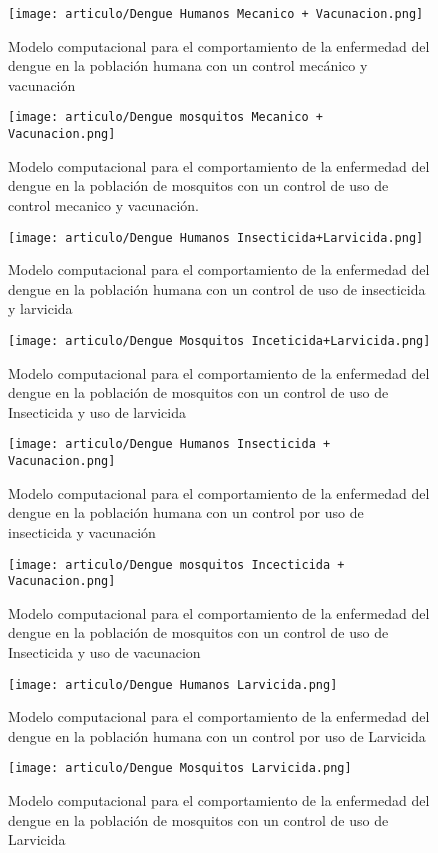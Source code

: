 \documentclass[journal]{IEEEtran}
\begin{document}
\begin{figure}[h]
\texttt{[image: articulo/Dengue Humanos Mecanico + Vacunacion.png]}
\centering 
\caption{Modelo computacional para el comportamiento de la enfermedad del dengue en la población humana con un control mecánico y vacunación}
\label{9J}
\end{figure}
\begin{figure}[h]
\texttt{[image: articulo/Dengue mosquitos Mecanico + Vacunacion.png]}
\centering 
\caption{Modelo computacional para el comportamiento de la enfermedad del dengue en la población de mosquitos con un control de uso de control mecanico y vacunación.}
\label{11J}
\end{figure}
\begin{figure}[h]
\texttt{[image: articulo/Dengue Humanos Insecticida+Larvicida.png]}
\centering 
\caption{Modelo computacional para el comportamiento de la enfermedad del dengue en la población humana con un control de uso de insecticida y larvicida}
\label{12J}
\end{figure}
\begin{figure}[h]
\texttt{[image: articulo/Dengue Mosquitos Inceticida+Larvicida.png]}
\centering 
\caption{Modelo computacional para el comportamiento de la enfermedad del dengue en la población de mosquitos con un control de uso de Insecticida y uso de larvicida}
\label{10J}
\end{figure}
\begin{figure}[h]
\texttt{[image: articulo/Dengue Humanos Insecticida + Vacunacion.png]}
\centering 
\caption{Modelo computacional para el comportamiento de la enfermedad del dengue en la población humana con un control por uso de insecticida y vacunación}
\label{13J}
\end{figure}
\begin{figure}[h]
\texttt{[image: articulo/Dengue mosquitos Incecticida + Vacunacion.png]}
\centering 
\caption{Modelo computacional para el comportamiento de la enfermedad del dengue en la población de mosquitos con un control de uso de Insecticida y uso de vacunacion}
\label{14J}
\end{figure}
\begin{figure}[h]
\texttt{[image: articulo/Dengue Humanos Larvicida.png]}
\centering 
\caption{Modelo computacional para el comportamiento de la enfermedad del dengue en la población humana con un control por uso de Larvicida}
\label{15J}
\end{figure}
\begin{figure}[h]
\texttt{[image: articulo/Dengue Mosquitos Larvicida.png]}
\centering 
\caption{Modelo computacional para el comportamiento de la enfermedad del dengue en la población de mosquitos con un control de uso de Larvicida}
\label{16J}
\end{figure}
\end{document}

